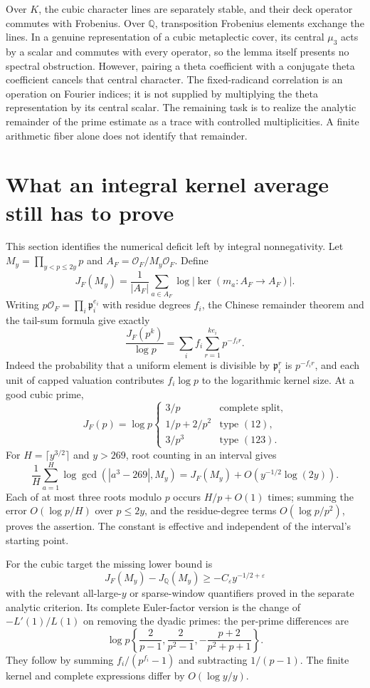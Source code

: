 \documentclass[11pt]{article}
\theoremstyle{remark}\newtheorem{remark}[theorem]{Remark}
\newcommand{\Q}{\mathbb Q}\newcommand{\Z}{\mathbb Z}\newcommand{\C}{\mathbb C}
\begin{document}
Over $K$, the cubic character lines are separately stable, and their deck operator commutes with Frobenius. Over $\Q$, transposition Frobenius elements exchange the lines. In a genuine representation of a cubic metaplectic cover, its central $\mu_3$ acts by a scalar and commutes with every operator, so the lemma itself presents no spectral obstruction. However, pairing a theta coefficient with a conjugate theta coefficient cancels that central character. The fixed-radicand correlation is an operation on Fourier indices; it is not supplied by multiplying the theta representation by its central scalar. The remaining task is to realize the analytic remainder of the prime estimate as a trace with controlled multiplicities. A finite arithmetic fiber alone does not identify that remainder.

\section{What an integral kernel average still has to prove}
This section identifies the numerical deficit left by integral nonnegativity. Let $M_y=\prod_{y<p\le2y}p$ and $A_F=\mathcal O_F/M_y\mathcal O_F$. Define
\[
 J_F(M_y)=\frac1{|A_F|}\sum_{a\in A_F}\log|\ker(m_a:A_F\to A_F)|.
\]
Writing $p\mathcal O_F=\prod_i\mathfrak p_i^{e_i}$ with residue degrees $f_i$, the Chinese remainder theorem and the tail-sum formula give exactly
\[
 \frac{J_F(p^k)}{\log p}=\sum_i f_i\sum_{r=1}^{ke_i}p^{-f_i r}.
\]
Indeed the probability that a uniform element is divisible by $\mathfrak p_i^r$ is $p^{-f_i r}$, and each unit of capped valuation contributes $f_i\log p$ to the logarithmic kernel size. At a good cubic prime,
\[
 J_F(p)=\log p\begin{cases}3/p&\text{complete split},\\1/p+2/p^2&\text{type }(12),\\3/p^3&\text{type }(123).\end{cases}
\]
For $H=\lceil y^{3/2}\rceil$ and $y>269$, root counting in an interval gives
\[
 \frac1H\sum_{a=1}^{H}\log\gcd(|a^3-269|,M_y)
 =J_F(M_y)+O(y^{-1/2}\log(2y)).
\]
Each of at most three roots modulo $p$ occurs $H/p+O(1)$ times; summing the error $O(\log p/H)$ over $p\le2y$, and the residue-degree terms $O(\log p/p^2)$, proves the assertion. The constant is effective and independent of the interval's starting point.

For the cubic target the missing lower bound is
\[
 J_F(M_y)-J_\Q(M_y)\ge-C_\varepsilon y^{-1/2+\varepsilon}
\]
with the relevant all-large-$y$ or sparse-window quantifiers proved in the separate analytic criterion. Its complete Euler-factor version is the change of $-L'(1)/L(1)$ on removing the dyadic primes: the per-prime differences are
\[
 \log p\left\{\frac2{p-1},\frac2{p^2-1},-\frac{p+2}{p^2+p+1}\right\}.
\]
They follow by summing $f_i/(p^{f_i}-1)$ and subtracting $1/(p-1)$. The finite kernel and complete expressions differ by $O(\log y/y)$.
\end{document}
